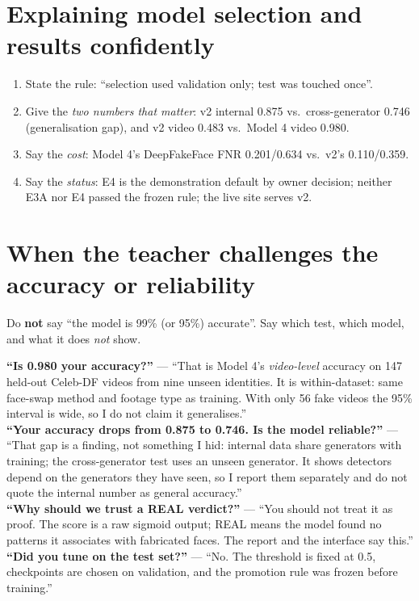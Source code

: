 \documentclass[11pt,a4paper]{report}
\begin{document}
\section{Explaining model selection and results confidently}
\begin{enumerate}
\item State the rule: ``selection used validation only; test was touched once''.
\item Give the \emph{two numbers that matter}: v2 internal 0.875 vs.\ cross-generator 0.746 (generalisation gap), and v2 video 0.483 vs.\ Model 4 video 0.980.
\item Say the \emph{cost}: Model 4's DeepFakeFace FNR 0.201/0.634 vs.\ v2's 0.110/0.359.
\item Say the \emph{status}: E4 is the demonstration default by owner decision; neither E3A nor E4 passed the frozen rule; the live site serves v2.
\end{enumerate}

\section{When the teacher challenges the accuracy or reliability}
\begin{warnbox}
Do \textbf{not} say ``the model is 99\% (or 95\%) accurate''. Say which test, which model, and what it does \emph{not} show.
\end{warnbox}
\begin{sayit}
\textbf{``Is 0.980 your accuracy?''} --- ``That is Model 4's \emph{video-level} accuracy on 147 held-out Celeb-DF videos from nine unseen identities. It is within-dataset: same face-swap method and footage type as training. With only 56 fake videos the 95\% interval is wide, so I do not claim it generalises.''\\[3pt]
\textbf{``Your accuracy drops from 0.875 to 0.746. Is the model reliable?''} --- ``That gap is a finding, not something I hid: internal data share generators with training; the cross-generator test uses an unseen generator. It shows detectors depend on the generators they have seen, so I report them separately and do not quote the internal number as general accuracy.''\\[3pt]
\textbf{``Why should we trust a REAL verdict?''} --- ``You should not treat it as proof. The score is a raw sigmoid output; REAL means the model found no patterns it associates with fabricated faces. The report and the interface say this.''\\[3pt]
\textbf{``Did you tune on the test set?''} --- ``No. The threshold is fixed at 0.5, checkpoints are chosen on validation, and the promotion rule was frozen before training.''
\end{sayit}
\end{document}
